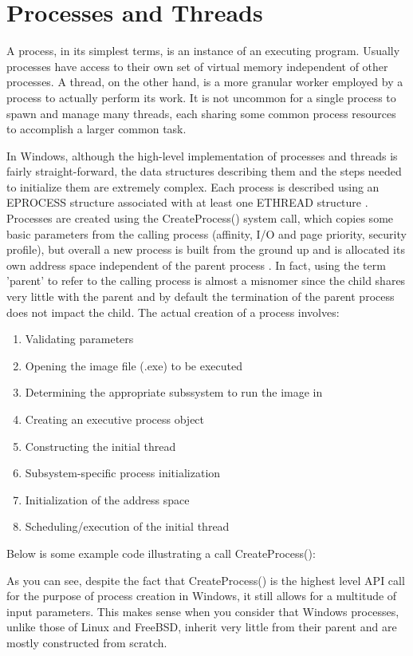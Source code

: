 \documentclass[onecolumn, draftclsnofoot,10pt, compsoc]{IEEEtran}
\begin{document}
\section{Processes and Threads}
A process, in its simplest terms, is an instance of an executing program. Usually processes have access to their own set of virtual memory independent of other processes. A thread, on the other hand, is a more granular worker employed by a process to actually perform its work. It is not uncommon for a single process to spawn and manage many threads, each sharing some common process resources to accomplish a larger common task.

In Windows, although the high-level implementation of processes and threads is fairly straight-forward, the data structures describing them and the steps needed to initialize them are extremely complex. Each process is described using an EPROCESS structure associated with at least one ETHREAD structure \cite{WindowsInternals}. Processes are created using the CreateProcess() system call, which copies some basic parameters from the calling process (affinity, I/O and page priority, security profile), but overall a new process is built from the ground up and is allocated its own address space independent of the parent process \cite{WindowsInternals}. In fact, using the term 'parent' to refer to the calling process is almost a misnomer since the child shares very little with the parent and by default the termination of the parent process does not impact the child. The actual creation of a process involves:
\begin{enumerate}
\item Validating parameters 
\item Opening the image file (.exe) to be executed
\item Determining the appropriate subssystem to run the image in 
\item Creating an executive process object
\item Constructing the initial thread
\item Subsystem-specific process initialization
\item Initialization of the address space
\item Scheduling/execution of the initial thread
\end{enumerate}

Below is some example code illustrating a call CreateProcess():

As you can see, despite the fact that CreateProcess() is the highest level API call for the purpose of process creation in Windows, it still allows for a multitude of input parameters. This makes sense when you consider that Windows processes, unlike those of Linux and FreeBSD, inherit very little from their parent and are mostly constructed from scratch.
\end{document}
